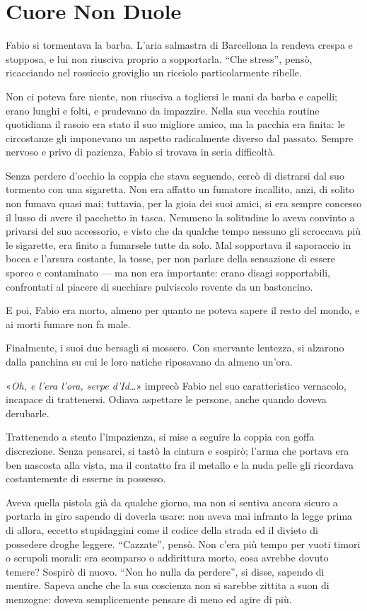\chapter{Cuore Non Duole}

Fabio si tormentava la barba. L'aria salmastra di Barcellona la rendeva crespa e stopposa, e lui non riusciva proprio a sopportarla. ``Che stress'', pensò, ricacciando nel rossiccio groviglio un ricciolo particolarmente ribelle.

Non ci poteva fare niente, non riusciva a togliersi le mani da barba e capelli; erano lunghi e folti, e prudevano da impazzire. Nella sua vecchia routine quotidiana il rasoio era stato il suo migliore amico, ma la pacchia era finita: le circostanze gli imponevano un aspetto radicalmente diverso dal passato. Sempre nervoso e privo di pazienza, Fabio si trovava in seria difficoltà.

Senza perdere d'occhio la coppia che stava seguendo, cercò di distrarsi dal suo tormento con una sigaretta. Non era affatto un fumatore incallito, anzi, di solito non fumava quasi mai; tuttavia, per la gioia dei suoi amici, si era sempre concesso il lusso di avere il pacchetto in tasca. Nemmeno la solitudine lo aveva convinto a privarsi del suo accessorio, e visto che da qualche tempo nessuno gli scroccava più le sigarette, era finito a fumarsele tutte da solo. Mal sopportava il saporaccio in bocca e l'arsura costante, la tosse, per non parlare della sensazione di essere sporco e contaminato --- ma non era importante: erano disagi sopportabili, confrontati al piacere di succhiare pulviscolo rovente da un bastoncino. 

E poi, Fabio era morto, almeno per quanto ne poteva sapere il resto del mondo, e ai morti fumare non fa male.

Finalmente, i suoi due bersagli si mossero. Con snervante lentezza, si alzarono dalla panchina su cui le loro natiche riposavano da almeno un'ora.

«\textit{Oh, e l'era l'ora, serpe d'Id\ldots}» imprecò Fabio nel suo caratteristico vernacolo, incapace di trattenersi. Odiava aspettare le persone, anche quando doveva derubarle. 

Trattenendo a stento l'impazienza, si mise a seguire la coppia con goffa discrezione. Senza pensarci, si tastò la cintura e sospirò; l'arma che portava era ben nascosta alla vista, ma il contatto fra il metallo e la nuda pelle gli ricordava costantemente di esserne in possesso. 

Aveva quella pistola già da qualche giorno, ma non si sentiva ancora sicuro a portarla in giro sapendo di doverla usare: non aveva mai infranto la legge prima di allora, eccetto stupidaggini come il codice della strada ed il divieto di possedere droghe leggere. ``Cazzate'', pensò. Non c'era più tempo per vuoti timori o scrupoli morali: era scomparso o addirittura morto, cosa avrebbe dovuto temere? Sospirò di nuovo. ``Non ho nulla da perdere'', si disse, sapendo di mentire. Sapeva anche che la sua coscienza non si sarebbe zittita a suon di menzogne: doveva semplicemente pensare di meno ed agire di più.

